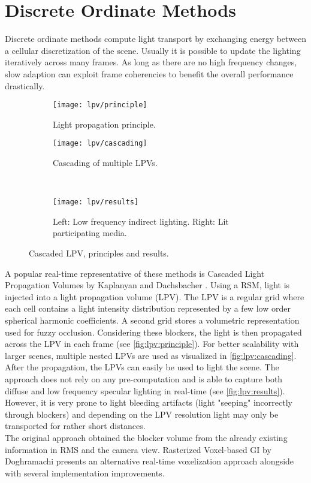 \documentclass[thesis.tex]{subfiles}
\begin{document}
\section{Discrete Ordinate Methods}
Discrete ordinate methods compute light transport by exchanging energy between a cellular discretization of the scene.
Usually it is possible to update the lighting iteratively across many frames.
As long as there are no high frequency changes, slow adaption can exploit frame coherencies to benefit the overall performance drastically.

\begin{figure}[h]
\centering
\begin{subfigure}[b]{0.35\textwidth}
\centering
\texttt{[image: lpv/principle]}
\caption{Light propagation principle.}
\label{fig:lpv:principle}
\end{subfigure}
\begin{subfigure}[b]{0.53\textwidth}
\centering
\texttt{[image: lpv/cascading]}
\caption{Cascading of multiple LPVs.}
\label{fig:lpv:cascading}
\end{subfigure}
\\
\begin{subfigure}[b]{\textwidth}
\centering
\texttt{[image: lpv/results]}
\caption{Left: Low frequency indirect lighting. Right: Lit participating media.}
\label{fig:lpv:results}
\end{subfigure}
\caption{\cite{bib:lpt} Cascaded LPV, principles and results.}
\end{figure}
A popular real-time representative of these methods is Cascaded Light Propagation Volumes by Kaplanyan and Dachsbacher \cite{bib:lpt}.
Using a RSM, light is injected into a light propagation volume (LPV).
The LPV is a regular grid where each cell contains a light intensity distribution represented by a few low order spherical harmonic coefficients.
A second grid stores a volumetric representation used for fuzzy occlusion.
Considering these blockers, the light is then propagated across the LPV in each frame (see \autoref{fig:lpv:principle}).
For better scalability with larger scenes, multiple nested LPVs are used as visualized in \autoref{fig:lpv:cascading}.
After the propagation, the LPVs can easily be used to light the scene.
The approach does not rely on any pre-computation and is able to capture both diffuse and low frequency specular lighting in real-time (see \autoref{fig:lpv:results}).
However, it is very prone to light bleeding artifacts (light "seeping" incorrectly through blockers) and depending on the LPV resolution light may only be transported for rather short distances.
\\
The original approach obtained the blocker volume from the already existing information in RMS and the camera view.
Rasterized Voxel-based GI by Doghramachi \cite{bib:rasterizedvbgi} presents an alternative real-time voxelization approach alongside with several implementation improvements.
\end{document}
